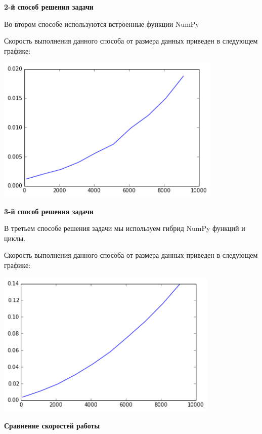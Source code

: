 \documentclass[12pt, a4paper]{article}
\begin{document}
			{\bf 2-й способ решения задачи\\}

				Во втором способе используются встроенные функции NumPy

				Скорость выполнения данного способа от размера данных приведен в следующем графике:
				\begin{center}
					\includegraphics[height=7cm]{timeit/num8_ti2.png}
				\end{center}


			{\bf 3-й способ решения задачи\\}

				В третьем способе решения задачи мы используем гибрид NumPy функций и циклы.

				Скорость выполнения данного способа от размера данных приведен в следующем графике:
				\begin{center}
					\includegraphics[height=7cm]{timeit/num8_ti3.png}
				\end{center}


			{\bf Сравнение скоростей работы\\}
\end{document}
